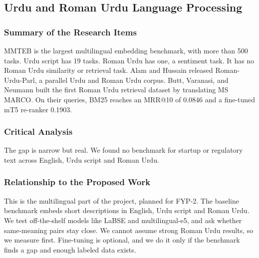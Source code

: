 \documentclass{FastFyp}
\begin{document}
\subsection{Urdu and Roman Urdu Language Processing}\label{sec:lr-urdu}

\subsubsection{Summary of the Research Items}
MMTEB \cite{ref:enevoldsen2025mmteb} is the largest multilingual embedding benchmark, with more than 500 tasks. Urdu script has 19 tasks. Roman Urdu has one, a sentiment task. It has no Roman Urdu similarity or retrieval task. Alam and Hussain \cite{ref:alam2022romanurduparl} released Roman-Urdu-Parl, a parallel Urdu and Roman Urdu corpus. Butt, Varanasi, and Neumann \cite{ref:butt2025romanurduir} built the first Roman Urdu retrieval dataset by translating MS MARCO. On their queries, BM25 reaches an MRR@10 of 0.0846 and a fine-tuned mT5 re-ranker 0.1903.

\subsubsection{Critical Analysis}
The gap is narrow but real. We found no benchmark for startup or regulatory text across English, Urdu script and Roman Urdu.

\subsubsection{Relationship to the Proposed Work}
This is the multilingual part of the project, planned for FYP-2. The baseline benchmark embeds short descriptions in English, Urdu script and Roman Urdu. We test off-the-shelf models like LaBSE and multilingual-e5, and ask whether same-meaning pairs stay close. We cannot assume strong Roman Urdu results, so we measure first. Fine-tuning is optional, and we do it only if the benchmark finds a gap and enough labeled data exists.
\end{document}
